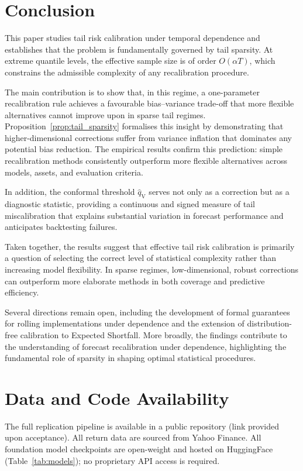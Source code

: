 \documentclass[preprint,11pt,authoryear]{elsarticle}
\newcommand{\1}{\boldsymbol{1}}
\newcommand{\qV}{\hat{q}_{\scriptscriptstyle\mathrm{V}}}
\begin{document}
	\section{Conclusion}
	\label{sec:conclude}
	
	This paper studies tail risk calibration under temporal dependence and establishes that the problem is fundamentally governed by tail sparsity. At extreme quantile levels, the effective sample size is of order $O(\alpha T)$, which constrains the admissible complexity of any recalibration procedure.

	The main contribution is to show that, in this regime, a one-parameter recalibration rule achieves a favourable bias--variance trade-off that more flexible alternatives cannot improve upon in sparse tail regimes. Proposition~\ref{prop:tail_sparsity} formalises this insight by demonstrating that higher-dimensional corrections suffer from variance inflation that dominates any potential bias reduction. The empirical results confirm this prediction: simple recalibration methods consistently outperform more flexible alternatives across models, assets, and evaluation criteria.

	In addition, the conformal threshold $\qV$ serves not only as a correction but as a diagnostic statistic, providing a continuous and signed measure of tail miscalibration that explains substantial variation in forecast performance and anticipates backtesting failures.

	Taken together, the results suggest that effective tail risk calibration is primarily a question of selecting the correct level of statistical complexity rather than increasing model flexibility. In sparse regimes, low-dimensional, robust corrections can outperform more elaborate methods in both coverage and predictive efficiency.

	Several directions remain open, including the development of formal guarantees for rolling implementations under dependence and the extension of distribution-free calibration to Expected Shortfall. More broadly, the findings contribute to the understanding of forecast recalibration under dependence, highlighting the fundamental role of sparsity in shaping optimal statistical procedures.

	\section*{Data and Code Availability}
	The full replication pipeline is available in a public repository (link provided upon acceptance). All return data are sourced from Yahoo Finance. All foundation model checkpoints are open-weight and hosted on HuggingFace (Table~\ref{tab:models}); no proprietary API access is required.
\end{document}
